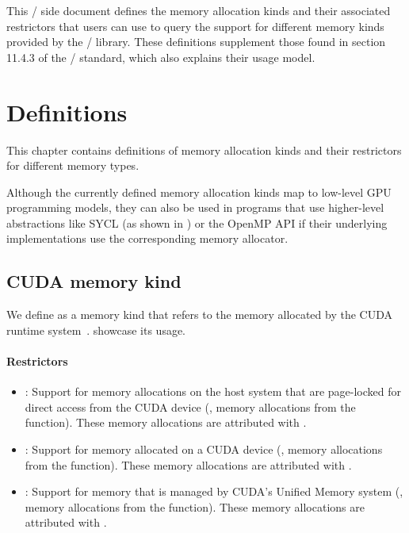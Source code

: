 This \mpi/ side document defines the memory allocation kinds and their
associated restrictors that users can use to query the support for
different memory kinds provided by the \mpi/ library. These definitions
supplement those found in section 11.4.3 of the \mpiivdoti/ standard, which
also explains their usage model.

\chapter{Definitions}
\label{chap:definitions}

This chapter contains definitions of memory allocation kinds and
their restrictors for different memory types.

Although the currently defined memory allocation kinds map to low-level
GPU programming models, they can also be used in programs that use
higher-level abstractions like SYCL (as shown in
) or the OpenMP API if their
underlying implementations use the corresponding memory allocator.

\section{CUDA memory kind}

We define  as a memory kind that refers to the memory
allocated by the CUDA runtime system~\cite{cudaref}.
showcase its usage.

\subsubsection{Restrictors}

\begin{itemize}

\item {}: Support for memory allocations on the host system
    that are page-locked for direct access from the CUDA device (\eg,
        memory allocations from the  function).
        These memory allocations are attributed with .

\item {}: Support for memory allocated on a CUDA device
    (\eg, memory allocations from the  function).
        These memory allocations are attributed with .

\item {}: Support for memory that is managed by CUDA’s
    Unified Memory system (\eg, memory allocations from the
         function).
        These memory allocations are attributed with .

\end{itemize}

